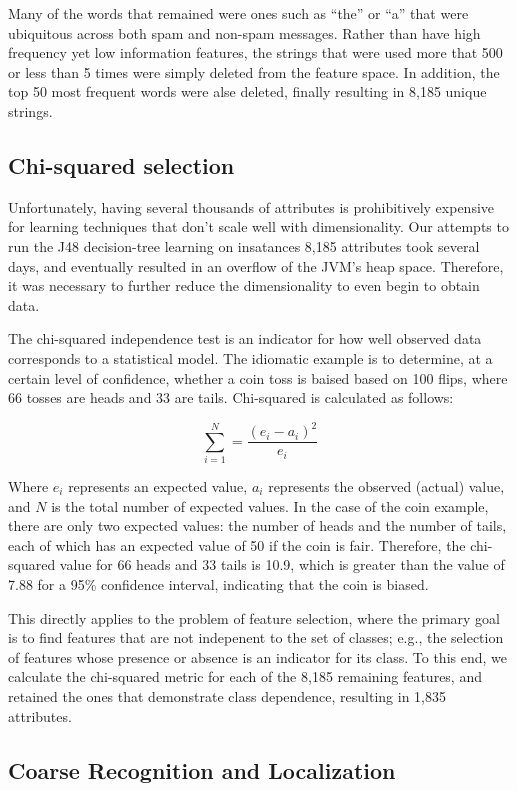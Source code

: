 \documentclass[letterpaper, 10 pt, conference]{ieeeconf}  %
\begin{document}
Many of the words that remained were ones such as ``the'' or ``a''
that were ubiquitous across both spam and non-spam messages. Rather
than have high frequency yet low information features, the strings
that were used more that 500 or less than 5 times were simply deleted
from the feature space. In addition, the top 50 most frequent words
were alse deleted, finally resulting in 8,185 unique strings. 

\subsection{Chi-squared selection}

Unfortunately, having several thousands of attributes is prohibitively
expensive for learning techniques that don't scale well with
dimensionality. Our attempts to run the J48 decision-tree learning on
insatances 8,185 attributes took several days, and eventually resulted
in an overflow of the JVM's heap space. Therefore, it was necessary to
further reduce the dimensionality to even begin to obtain data.

The chi-squared independence test is an indicator for how well
observed data corresponds to a statistical model. The idiomatic
example is to determine, at a certain level of confidence, whether a
coin toss is baised based on 100 flips, where 66 tosses are heads and
33 are tails. Chi-squared is calculated as follows:

\[\sum_{i=1}^{N}=\frac{(e_i-a_i)^2}{e_i}\]

Where $e_i$ represents an expected value, $a_i$ represents the
observed (actual) value, and $N$ is the total number of expected
values. In the case of the coin example, there are only two expected
values: the number of heads and the number of tails, each of which has
an expected value of 50 if the coin is fair. Therefore, the
chi-squared value for 66 heads and 33 tails is 10.9, which is greater
than the value of 7.88 for a 95\% confidence interval, indicating that
the coin is biased.

This directly applies to the problem of feature selection, where the
primary goal is to find features that are not indepenent to the set of
classes; e.g., the selection of features whose presence or absence is
an indicator for its class. To this end, we calculate the chi-squared
metric for each of the 8,185 remaining features, and retained the
ones that demonstrate class dependence, resulting in 1,835 attributes.

\subsection{Coarse Recognition and Localization}
\end{document}

